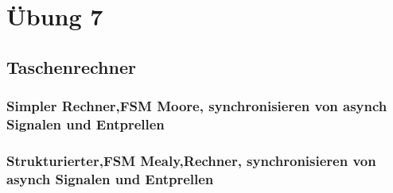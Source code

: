 \section{Übung 7}
\subsection{Taschenrechner}
\subsubsection{Simpler Rechner,FSM Moore, synchronisieren von asynch Signalen und Entprellen}

\subsubsection{Strukturierter,FSM Mealy,Rechner, synchronisieren von asynch Signalen und Entprellen}


